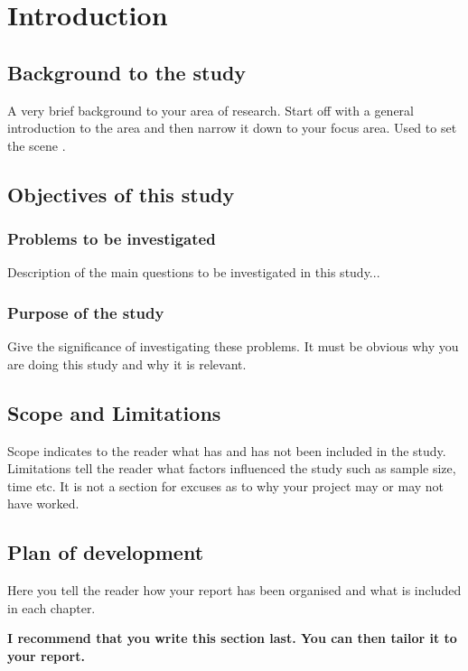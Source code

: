 \chapter{Introduction}

\section{Background to the study}
A very brief background to your area of research. Start off with a general introduction to the area and
then narrow it down to your focus area. Used to set the scene \cite{smt2011}.
\section{Objectives of this study}
\subsection{Problems to be investigated}
Description of the main questions to be investigated in this study...
\subsection{Purpose of the study}
Give the significance of investigating these problems. It must be obvious why you are doing this study
and why it is relevant.

\section{Scope and Limitations}
Scope indicates to the reader what has and has not been included in the study. Limitations tell the
reader what factors influenced the study such as sample size, time etc. It is not a section for excuses as
to why your project may or may not have worked.

\section{Plan of development}
Here you tell the reader how your report has been organised and what is included in each
chapter.

{\bf I recommend that you write this section last. You can then tailor it to your report.}
